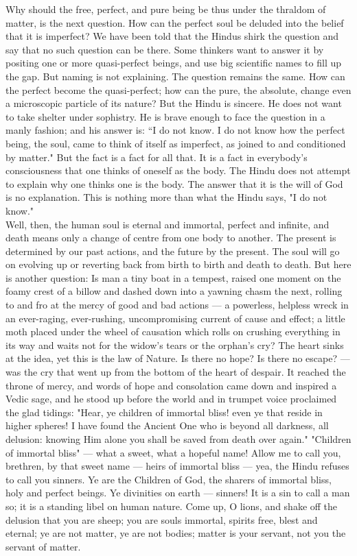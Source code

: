 Why should the free, perfect, and pure being be thus under the
thraldom of matter, is the next question. How
can the perfect soul be deluded
into the belief that it is imperfect? We have been told
that the Hindus shirk the question and say that no such question can be
there.
Some thinkers want to answer it by positing one or more quasi-perfect
beings, and use
big scientific names to fill up the gap. But naming is not explaining.
The question
remains the same. How can the perfect become the quasi-perfect; how can
the pure,
the absolute, change even a microscopic particle of its nature? But the
Hindu is
sincere. He does not want to take shelter under sophistry. He is brave
enough to face
the question in a manly fashion; and his answer is: “I do not know. I
do not know
how the perfect being, the soul, came to think of itself as imperfect,
as joined to and
conditioned by matter." But the fact is a fact for all that. It is a
fact in
everybody's consciousness that one thinks of oneself as the body. The
Hindu does not
attempt to explain why one thinks one is the body. The answer that it
is the will of
God is no explanation. This is nothing more than what the Hindu says,
"I do not
know."\\

Well, then, the human soul is eternal and immortal, perfect
and infinite, and death means only a change of centre from one body to
another. The present is determined by our past actions, and the future
by the present. The soul will go on evolving up or reverting back from
birth to birth and death to death. But here is another question: Is man
a tiny boat in a tempest, raised one moment on the foamy crest of a
billow and dashed down into a yawning chasm the next, rolling to and
fro at the mercy of good and bad actions — a powerless, helpless wreck
in an ever-raging, ever-rushing, uncompromising current of cause and
effect; a little moth placed under the wheel of causation which rolls
on crushing everything in its way and waits not for the widow's tears
or the orphan's cry? The heart sinks at the idea, yet this is the law
of Nature. Is there no hope? Is there no escape? — was the
cry that went up from the bottom
of the heart of despair. It reached the throne of
mercy, and words of hope and consolation came down and inspired a Vedic
sage, and he
stood up before the world and in trumpet voice proclaimed the glad
tidings: "Hear,
ye children of immortal bliss! even ye that reside in higher spheres! I
have found the
Ancient One who is beyond all darkness, all delusion: knowing Him alone
you shall be
saved from death over again." "Children of immortal bliss" — what
a sweet, what a hopeful name! Allow me to call you, brethren, by that
sweet name —
heirs of immortal bliss — yea, the Hindu refuses to call you sinners.
Ye are the
Children of God, the sharers of immortal bliss, holy and perfect
beings. Ye divinities
on earth — sinners! It is a sin to call a man so; it is a standing
libel on human
nature. Come up, O lions, and shake off the delusion that you are
sheep; you are souls
immortal, spirits free, blest and eternal; ye are not matter, ye are
not bodies; matter
is your servant, not you the servant of matter. \\


